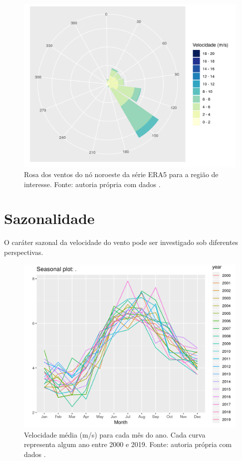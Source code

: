 \documentclass[
	12pt,				%
	openright,			%
	oneside,			%
	a4paper,			%
	english,			%
	french,				%
	spanish,			%
	brazil				%
	]{abntex2}
\begin{document}
\begin{figure}[h]
    \centering
	\includegraphics[width=\textwidth]{windrose}
	\caption{Rosa dos ventos do nó noroeste da série ERA5 para a região de interesse. Fonte: autoria própria com dados \cite{era5}.}
	\label{fig:windrose}
\end{figure}
\FloatBarrier

\section{Sazonalidade}

O caráter sazonal da velocidade do vento pode ser investigado sob diferentes perspectivas. 

\begin{figure}[h]
    \centering
	\includegraphics[width=\textwidth]{season_plot}
	\caption{Velocidade média (m/s) para cada mês do ano. Cada curva representa algum ano entre 2000 e 2019. Fonte: autoria própria com dados \cite{era5}.}
\end{figure}
\FloatBarrier
\end{document}
